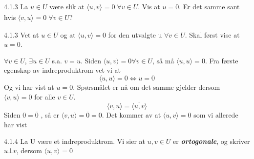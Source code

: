 \documentclass[a4paper,norsk]{article}
\begin{document}
\begin{oppgavebox}{4.1.3}{}
La $ u \in U $ være slik at $ \langle u, v \rangle_{  } = 0 \; \forall v \in U $. Vis at $ u=0 $. Er det samme sant hvis $ \langle v, u \rangle_{  } = 0 \; \forall v \in U $? 
\begin{proofbox}{4.1.3}{}
Vet at $ u \in U $ og at $ \langle u, v \rangle =0 $ for den utvalgte u $ \forall v \in U $. Skal først vise at $ u=0 $.

$ \forall v \in U$, $ \exists u \in U $ s.a. $ v=u $. Siden $ \langle u, v \rangle =0 \forall v \in U $, så må $ \langle u,u \rangle = 0$. Fra første egenskap av indreproduktrom vet vi at
\[
    \langle u, u \rangle =0 \Longleftrightarrow u=0
\]
Og vi har vist at $ u=0 $. Spørsmålet er nå om det samme gjelder dersom $ \langle v, u \rangle =0 $ for alle $ v \in U $.
\[
    \langle v, u \rangle = \overline{ \langle u, v \rangle }
\]
Siden $ 0 = \overline{0} $ , så er $ \langle v, u \rangle = \overline{0}  =0$. Det kommer av at $ \langle u, v \rangle =0 $ som vi allerede har vist
\end{proofbox}
\end{oppgavebox}


\begin{definitionbox}{4.1.4}{}
La U være et indreproduktrom. Vi sier at $ u, v \in U $ er \textbf{\textit{ortogonale}}, og skriver $ u \bot v $, dersom $ \langle u, v \rangle_{  } =0 $ 
\end{definitionbox}
\end{document}
